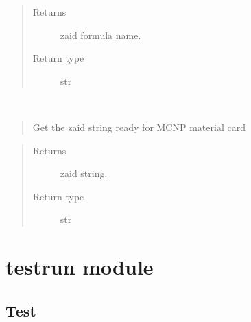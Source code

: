 \documentclass[letterpaper,10pt,english]{sphinxmanual}
\begin{document}
\begin{fulllineitems}
\begin{fulllineitems}
\begin{quote}
\begin{description}
\item[{Returns}] \leavevmode
{} \textendash{} zaid formula name.

\item[{Return type}] \leavevmode
str

\end{description}\end{quote}

\end{fulllineitems}


\begin{fulllineitems}
\label{\detokenize{api/inputgeneration:matreader.Zaid.to_text}}~\begin{quote}

Get the zaid string ready for MCNP material card
\end{quote}
\begin{quote}\begin{description}
\item[{Returns}] \leavevmode
zaid string.

\item[{Return type}] \leavevmode
str

\end{description}\end{quote}

\end{fulllineitems}


\end{fulllineitems}



\section{testrun module}
\label{\detokenize{api/inputgeneration:testrun-module}}\label{\detokenize{api/inputgeneration:testrunmodule}}

\subsection{Test}
\label{\detokenize{api/inputgeneration:test}}\label{\detokenize{api/inputgeneration:testob}}
\end{document}

